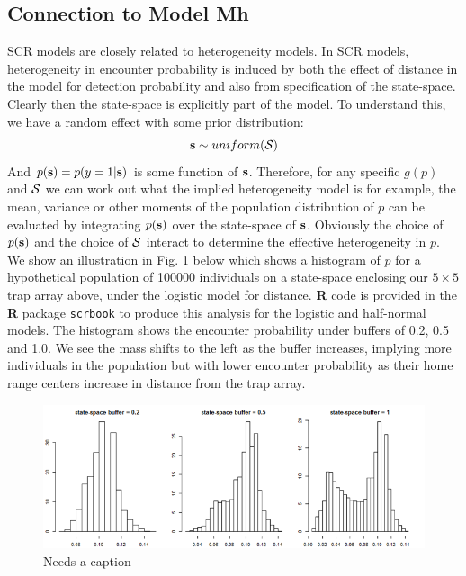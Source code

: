 \subsection{Connection to Model Mh}  \label{scr0.sec.scrmh}

SCR models are closely related to heterogeneity models. In SCR models,
heterogeneity in encounter probability is induced by both the effect
of distance in the model for detection probability and also from
specification of the state-space. Clearly then the state-space is
explicitly part of the model. To understand this, we have a random
effect with some prior distribution:
\[
{\bf s} \sim uniform({\cal S})
\]
And $p({\bf s}) = p(y=1|{\bf s})$ is some function of ${\bf
  s}$. Therefore, for any specific $g(p)$ and ${\cal S}$ we can work
out what the implied heterogeneity model is for example, the mean,
variance or other moments of the population distribution of $p$ can be
evaluated by integrating $p({\bf s})$ over the state-space of ${\bf
  s}$.  Obviously the choice of $p({\bf s})$ and the choice of ${\cal
  S}$ interact to determine the effective heterogeneity in $p$. We
show an illustration in Fig. \ref{scr0.fig.buffereffect} below which
shows a histogram of $p$ for a hypothetical population of 100000
individuals on a state-space enclosing our $5 \times 5$ trap array
above, under the logistic model for distance. {\bf R} code is
provided in the {\bf R} package \mbox{\tt scrbook} to produce this analysis for the
logistic and half-normal models. The histogram shows the encounter
probability under buffers of 0.2, 0.5 and 1.0. We see the mass shifts
to the left as the buffer increases, implying more individuals in the
population but with lower encounter probability as their home range
centers increase in distance from the trap array.


\begin{figure}
\begin{center}
\includegraphics[width=5in]{figs/buffereffect}
\end{center}
\caption{Needs a caption}
\label{scr0.fig.buffereffect}
\end{figure}

